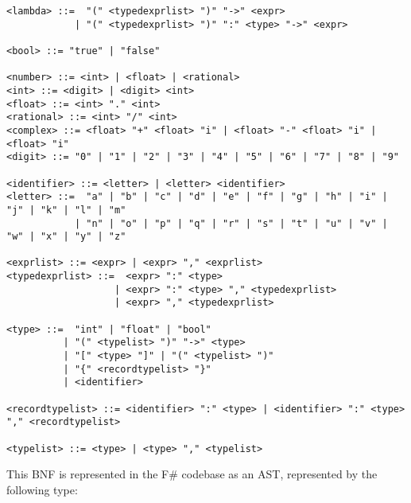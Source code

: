 \begin{verbatim}
<lambda> ::=  "(" <typedexprlist> ")" "->" <expr>
            | "(" <typedexprlist> ")" ":" <type> "->" <expr>

<bool> ::= "true" | "false"

<number> ::= <int> | <float> | <rational>
<int> ::= <digit> | <digit> <int>
<float> ::= <int> "." <int>
<rational> ::= <int> "/" <int>
<complex> ::= <float> "+" <float> "i" | <float> "-" <float> "i" | <float> "i"
<digit> ::= "0" | "1" | "2" | "3" | "4" | "5" | "6" | "7" | "8" | "9"

<identifier> ::= <letter> | <letter> <identifier>
<letter> ::=  "a" | "b" | "c" | "d" | "e" | "f" | "g" | "h" | "i" | "j" | "k" | "l" | "m" 
            | "n" | "o" | "p" | "q" | "r" | "s" | "t" | "u" | "v" | "w" | "x" | "y" | "z"

<exprlist> ::= <expr> | <expr> "," <exprlist>
<typedexprlist> ::=  <expr> ":" <type> 
                   | <expr> ":" <type> "," <typedexprlist>
                   | <expr> "," <typedexprlist>

<type> ::=  "int" | "float" | "bool" 
          | "(" <typelist> ")" "->" <type> 
          | "[" <type> "]" | "(" <typelist> ")"
          | "{" <recordtypelist> "}"
          | <identifier>

<recordtypelist> ::= <identifier> ":" <type> | <identifier> ":" <type> "," <recordtypelist>

<typelist> ::= <type> | <type> "," <typelist>
\end{verbatim}

This BNF is represented in the F\# codebase as an AST, represented by the following type:

